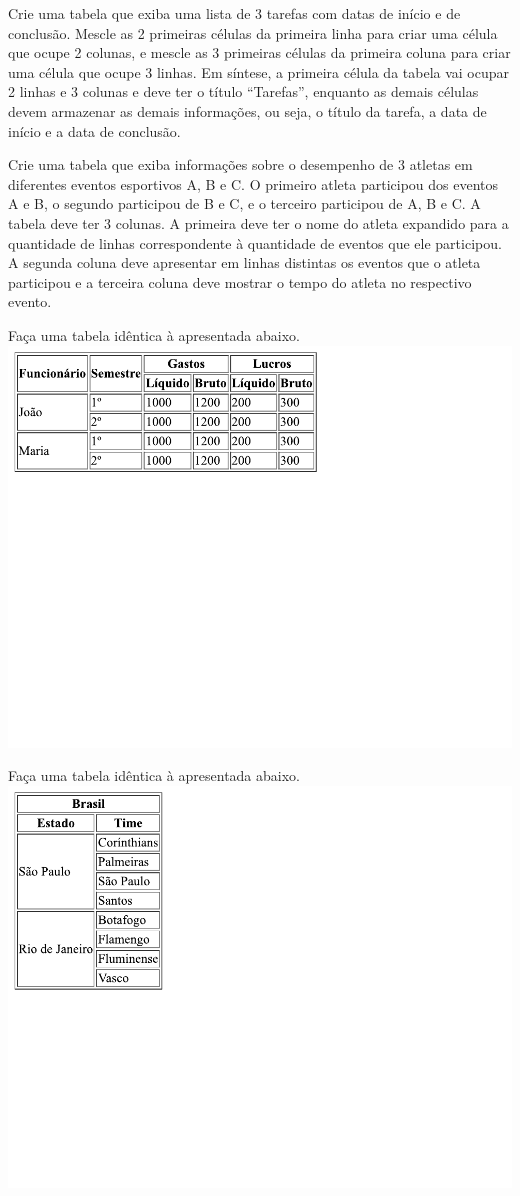 \begin{exercise}
Crie uma tabela que exiba uma lista de 3 tarefas com datas de início e de conclusão. Mescle as 2 primeiras células da primeira linha para criar uma célula que ocupe 2 colunas, e mescle as 3 primeiras células da primeira coluna para criar uma célula que ocupe 3 linhas. Em síntese, a primeira célula da tabela vai ocupar 2 linhas e 3 colunas e deve ter o título ``Tarefas'', enquanto as demais células devem armazenar as demais informações, ou seja, o título da tarefa, a data de início e a data de conclusão.
\end{exercise}

\begin{exercise}
Crie uma tabela que exiba informações sobre o desempenho de 3 atletas em diferentes eventos esportivos A, B e C. O primeiro atleta participou dos eventos A e B, o segundo participou de B e C, e o terceiro participou de A, B e C. A tabela deve ter 3 colunas. A primeira deve ter o nome do atleta expandido para a quantidade de linhas correspondente à quantidade de eventos que ele participou. A segunda coluna deve apresentar em linhas distintas os eventos que o atleta participou e a terceira coluna deve mostrar o tempo do atleta no respectivo evento.
\end{exercise}

\begin{exercise}
Faça uma tabela idêntica à apresentada abaixo. \\
\includegraphics[width=.5\textwidth, trim={0 8.8cm 7cm 0}]{Images/chapter04/html_ex_table_01.pdf}     
\end{exercise}

\begin{exercise}
Faça uma tabela idêntica à apresentada abaixo. \\
\includegraphics[width=.5\textwidth, trim={0 6.3cm 7cm 0}]{Images/chapter04/html_ex_table_02.pdf}     
\end{exercise}

